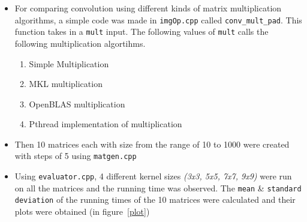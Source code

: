 \documentclass{article}
\begin{document}
\begin{itemize}

\item For comparing convolution using different kinds of matrix multiplication algorithms, a simple code was made in \verb!imgOp.cpp! called \verb!conv_mult_pad!. This function takes in a \verb!mult! input. The following values of \verb!mult! calls the following multiplication algortihms.

\begin{enumerate}
\item Simple Multiplication
\item 
 MKL multiplication
\item OpenBLAS multiplication
\item Pthread implementation of multiplication
\end{enumerate}

\item Then 10 matrices each with size from the range of 10 to 1000 were created with steps of 5 using \verb!matgen.cpp!

\item Using \verb!evaluator.cpp!, 4 different kernel sizes \emph{(3x3, 5x5, 7x7, 9x9)} were run on all the matrices and the running time was observed. The \verb!mean! \& \verb!standard deviation! of the running times of the 10 matrices were calculated and their plots were obtained (in figure~\ref{plot})


\end{itemize}
\end{document}
